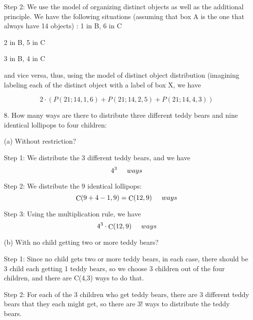 \documentclass[12pt]{amsart}
\DeclareMathOperator{\comb}{C}
\begin{document}
Step 2: We use the model of organizing distinct objects as well as the additional principle. We have the following situations (assuming that box A is the one that  always have 14 objects) : 
1 in B, 6 in C
\smallskip

2 in B, 5 in C
\smallskip

3 in B, 4 in C
\smallskip

and vice versa, thus, using the model of distinct object distribution (imagining labeling each of the distinct object with a label of box X, we have 

\begin{displaymath}
2 \cdot (P(21;14,1,6) + P (21;14,2,5) + P (21;14,4,3))
\end{displaymath}
\smallskip



8. How many ways are there to distribute three different teddy bears and nine
identical lollipops to four children:
\smallskip

(a) Without restriction?
\smallskip

Step 1: We distribute the 3 different teddy bears, and we have 
\begin{displaymath}
4^3   \hspace{0.5cm}   ways
\end{displaymath}

Step 2: We distribute the 9 identical lollipops:
\smallskip
\begin{displaymath}
\comb(9+4-1,9) =\comb (12,9)  \hspace{0.5cm}   ways
\end{displaymath}

Step 3: Using the multiplication rule, we have 
\begin{displaymath}
4^3\cdot\comb (12,9) \hspace{0.5cm}   ways
\end{displaymath}

\smallskip

(b) With no child getting two or more teddy bears?
\smallskip

Step 1: Since no child gets two or more teddy bears, in each case, there should be 3 child each getting 1 teddy bears, so we choose 3 children out of the four children, and there are C(4,3) ways to do that.
\smallskip

Step 2: For each of the 3 children who get teddy bears, there are 3 different teddy bears that they each might get, so there are 3! ways to distribute the teddy bears. 
\smallskip
\end{document}
